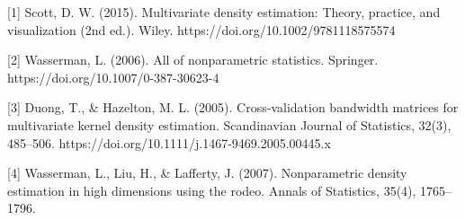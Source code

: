 \documentclass{article}
\begin{document}
{
\small

[1] Scott, D. W. (2015). Multivariate density estimation: Theory, practice, and visualization (2nd ed.). Wiley. https://doi.org/10.1002/9781118575574

[2] Wasserman, L. (2006). All of nonparametric statistics. Springer. https://doi.org/10.1007/0-387-30623-4

[3] Duong, T., \& Hazelton, M. L. (2005). Cross-validation bandwidth matrices for multivariate kernel density estimation. Scandinavian Journal of Statistics, 32(3), 485–506. https://doi.org/10.1111/j.1467-9469.2005.00445.x

[4] Wasserman, L., Liu, H., \& Lafferty, J. (2007). Nonparametric density estimation in high dimensions using the rodeo. Annals of Statistics, 35(4), 1765–1796.



}
\end{document}
